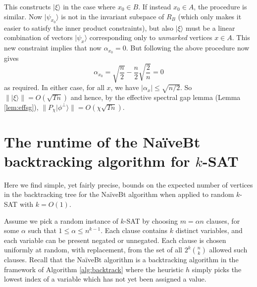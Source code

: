 \documentclass[11pt]{article}
\newcommand{\ket}[1]{| #1 \rangle}
\begin{document}
This constructs $\ket{\xi}$ in the case where $x_0 \in B$. If instead $x_0 \in A$, the procedure is similar. Now $\ket{\psi_{x_0}}$ is not in the invariant subspace of $R_B$ (which only makes it easier to satisfy the inner product constraints), but also $\ket{\xi}$ must be a linear combination of vectors $\ket{\psi_x}$ corresponding only to {\em unmarked} vertices $x \in A$. This new constraint implies that now $\alpha_{x_0} = 0$. But following the above procedure now gives
%
\[ \alpha_{x_0} = \sqrt{\frac{n}{2}} - \frac{n}{2}\sqrt{\frac{2}{n}} = 0 \]
%
as required. In either case, for all $x$, we have $|\alpha_x| \le \sqrt{n/2}$. So $\|\ket{\xi}\| = O(\sqrt{Tn})$ and hence, by the effective spectral gap lemma (Lemma \ref{lem:effsg}), $\|P_\chi \ket{\phi^\perp}\| = O(\chi \sqrt{Tn})$.


\section{The runtime of the Na\"iveBt backtracking algorithm for $k$-SAT}
\label{app:ordereddll}

Here we find simple, yet fairly precise, bounds on the expected number of vertices in the backtracking tree for the Na\"iveBt algorithm when applied to random $k$-SAT with $k=O(1)$.

Assume we pick a random instance of $k$-SAT by choosing $m=\alpha n$ clauses, for some $\alpha$ such that $1 \le \alpha \le n^{k-1}$. Each clause contains $k$ distinct variables, and each variable can be present negated or unnegated. Each clause is chosen uniformly at random, with replacement, from the set of all $2^k \binom{n}{k}$ allowed such clauses. Recall that the Na\"iveBt algorithm is a backtracking algorithm in the framework of Algorithm \ref{alg:backtrack} where the heuristic $h$ simply picks the lowest index of a variable which has not yet been assigned a value.
\end{document}
